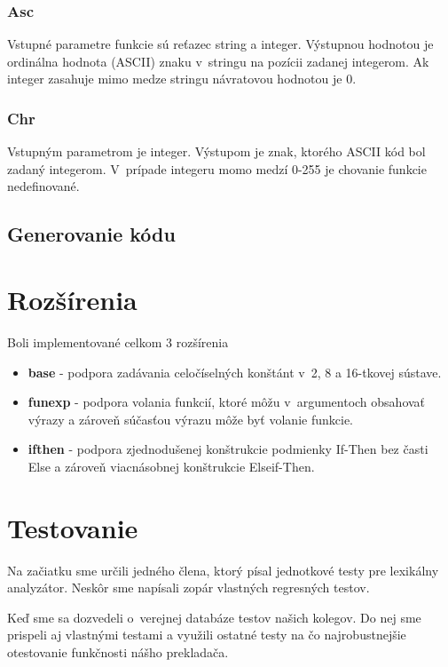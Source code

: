 \documentclass{article}
\begin{document}
            \subsubsection{Asc}
            Vstupné parametre funkcie sú reťazec string a integer. Výstupnou hodnotou je ordinálna
            hodnota (ASCII) znaku v~stringu na pozícii zadanej integerom. Ak integer zasahuje mimo 
            medze stringu návratovou hodnotou je 0.
            
            \subsubsection{Chr}
            Vstupným parametrom je integer. Výstupom je znak, ktorého ASCII kód bol zadaný integerom.
            V~prípade integeru momo medzí 0-255 je chovanie funkcie nedefinované.
            
        \subsection{Generovanie kódu}
        
    \section{Rozšírenia}
    Boli implementované celkom 3 rozšírenia
        \begin{itemize}
            \item \textbf{base}   - podpora zadávania celočíselných konštánt v~2, 8 a 16-tkovej sústave.
            \item \textbf{funexp} - podpora volania funkcií, ktoré môžu v~argumentoch obsahovať výrazy 
                                        a zároveň súčasťou výrazu môže byť volanie funkcie.
            \item  \textbf{ifthen} - podpora zjednodušenej konštrukcie podmienky If-Then bez časti Else
                                        a zároveň viacnásobnej konštrukcie Elseif-Then.
        \end{itemize}
    
    \section{Testovanie}
    Na začiatku sme určili jedného člena, ktorý písal jednotkové testy pre lexikálny analyzátor. 
    Neskôr sme napísali zopár vlastných regresných testov.
    
    Keď sme sa dozvedeli o~verejnej databáze testov našich kolegov. Do nej sme prispeli aj vlastnými testami a využili ostatné testy na čo najrobustnejšie otestovanie funkčnosti nášho prekladača.
    
\end{document}
